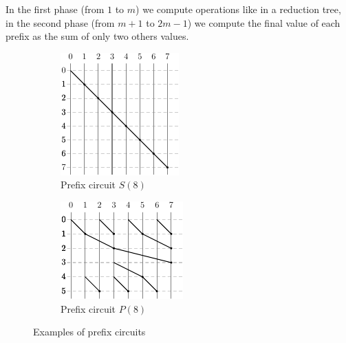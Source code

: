 \documentclass{article}
\begin{document}
\medskip

In the first phase (from $1$ to $m$) we compute operations like in a reduction tree, in the second phase (from $m+1$ to $2m -1$) we compute the final value of each prefix as the sum of only two others values.

\begin{figure}[h]
\centering
\begin{subfigure}{.5\textwidth}
  \centering
  \includegraphics[width=.9\linewidth]{img/circuit-serial}
  \caption{Prefix circuit $S(8)$}
  \label{fig:sub1}
\end{subfigure}%
\begin{subfigure}{.5\textwidth}
  \centering
  \includegraphics[width=.9\linewidth]{img/circuit-parallel}
  \caption{Prefix circuit $P(8)$}
  \label{fig:sub2}
\end{subfigure}
\caption{Examples of prefix circuits}
\label{fig:test}
\end{figure}
\end{document}
